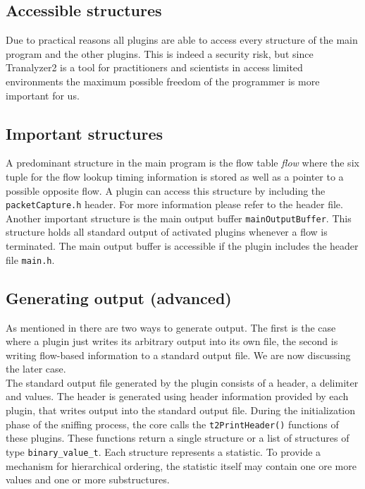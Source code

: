 \documentclass[documentation]{subfiles}
\begin{document}
\subsection{Accessible structures}
Due to practical reasons all plugins are able to access every structure of the main program and the other plugins. This is indeed a security risk, but since Tranalyzer2 is a tool for practitioners and scientists in access limited environments the maximum possible freedom of the programmer is more important for us.

\subsection{Important structures}
A predominant structure in the main program is the flow table {\em flow} where the six tuple for the flow lookup timing information is stored as well as a pointer to a possible opposite flow. A plugin can access this structure by including the {\tt packetCapture.h} header. For more information please refer to the header file.\\
Another important structure is the main output buffer {\tt mainOutputBuffer}. This structure holds all standard output of activated plugins whenever a flow is terminated. The main output buffer is accessible if the plugin includes the header file {\tt main.h}.

\subsection{Generating output (advanced)}\label{section:output2}
As mentioned in  there are two ways to generate output. The first is the case where a plugin just writes its arbitrary output into its own file, the second is writing flow-based information to a standard output file. We are now discussing the later case. \\

The standard output file generated by the  plugin consists of a header, a delimiter and values. The header is generated using header information provided by each plugin, that writes output into the standard output file. During the initialization phase of the sniffing process, the core calls the {\tt t2PrintHeader()} functions of these plugins. These functions return a single structure or a list of structures of type {\tt binary\_value\_t}. Each structure represents a statistic. To provide a mechanism for hierarchical ordering, the statistic itself may contain one ore more values and one or more substructures.\\
\end{document}
